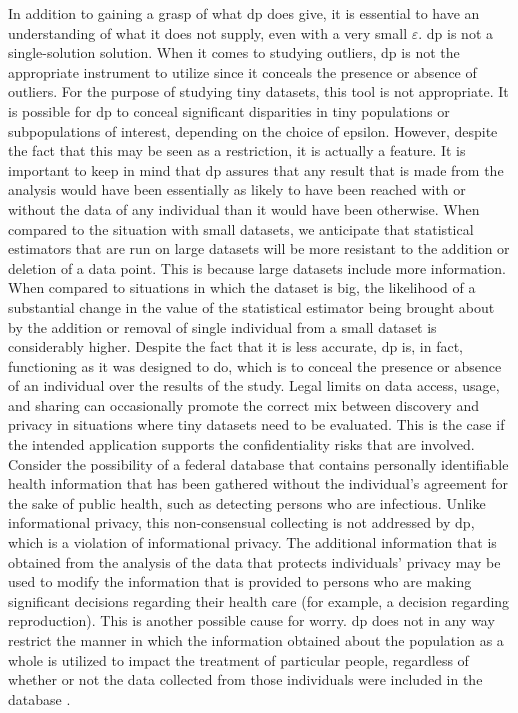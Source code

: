 In addition to gaining a grasp of what \acrshort{dp} does give, it is essential to have an understanding of what it does not supply, even with a very small $\varepsilon$. \acrshort{dp} is not a single-solution solution. When it comes to studying outliers, \acrshort{dp} is not the appropriate instrument to utilize since it conceals the presence or absence of outliers. For the purpose of studying tiny datasets, this tool is not appropriate. It is possible for \acrshort{dp} to conceal significant disparities in tiny populations or subpopulations of interest, depending on the choice of epsilon. However, despite the fact that this may be seen as a restriction, it is actually a feature. It is important to keep in mind that \acrshort{dp} assures that any result that is made from the analysis would have been essentially as likely to have been reached with or without the data of any individual than it would have been otherwise. When compared to the situation with small datasets, we anticipate that statistical estimators that are run on large datasets will be more resistant to the addition or deletion of a data point. This is because large datasets include more information. When compared to situations in which the dataset is big, the likelihood of a substantial change in the value of the statistical estimator being brought about by the addition or removal of single individual from a small dataset is considerably higher. Despite the fact that it is less accurate, \acrshort{dp} is, in fact, functioning as it was designed to do, which is to conceal the presence or absence of an individual over the results of the study. Legal limits on data access, usage, and sharing can occasionally promote the correct mix between discovery and privacy in situations where tiny datasets need to be evaluated. This is the case if the intended application supports the confidentiality risks that are involved. Consider the possibility of a federal database that contains personally identifiable health information that has been gathered without the individual's agreement for the sake of public health, such as detecting persons who are infectious. Unlike informational privacy, this non-consensual collecting is not addressed by \acrshort{dp}, which is a violation of informational privacy. The additional information that is obtained from the analysis of the data that protects individuals' privacy may be used to modify the information that is provided to persons who are making significant decisions regarding their health care (for example, a decision regarding reproduction). This is another possible cause for worry. \acrshort{dp} does not in any way restrict the manner in which the information obtained about the population as a whole is utilized to impact the treatment of particular people, regardless of whether or not the data collected from those individuals were included in the database \cite{DWORK2019}.

